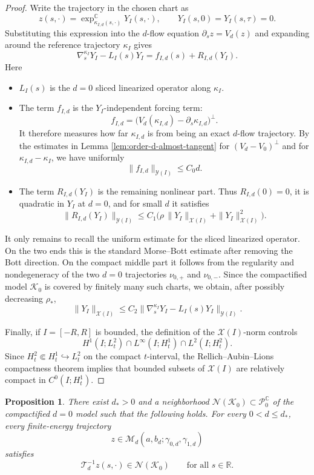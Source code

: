 \documentclass[11pt]{amsart}
\theoremstyle{plain}
\newtheorem{prop}[thm]{Proposition}
\theoremstyle{definition}
\newcommand{\R}{\mathbb{R}}
\newcommand{\C}{\mathbb{C}}
\newcommand{\PP}{\mathcal{P}}
\begin{document}
\begin{proof}
Write the trajectory in the chosen chart as
\[
z(s,\cdot)=\exp_{\kappa_{I,d}(s,\cdot)}^{\C}Y_I(s,\cdot),\qquad Y_I(s,0)=Y_I(s,\tau)=0 .
\]
Substituting this expression into the $d$-flow equation $\partial_s z=V_d(z)$ and expanding around the reference trajectory $\kappa_I$ gives
\[
\nabla^{\kappa_I}_{s}Y_I-L_I(s)Y_I
=f_{I,d}(s)+R_{I,d}(Y_I).
\]
Here 
\begin{itemize}
\setlength{\itemsep}{-1pt}
    \item $L_I(s)$ is the $d=0$ sliced linearized operator along $\kappa_I$.
    \item The term $f_{I,d}$ is the $Y_I$-independent forcing term:
    \[
 f_{I,d}
 =\bigl(V_d(\kappa_{I,d})-\partial_s\kappa_{I,d}\bigr)^{\perp}.
\]
It therefore measures how far $\kappa_{I,d}$ is from being an exact
$d$-flow trajectory. By the estimates in Lemma \ref{lem:order-d-almost-tangent} for $(V_d-V_0)^{\perp}$ and for
$\kappa_{I,d}-\kappa_I$, we have uniformly
\[
\|f_{I,d}\|_{\mathcal Y(I)}\le C_0 d.
\]
    \item The term $R_{I,d}(Y_I)$ is the remaining nonlinear part. Thus $R_{I,d}(0)=0$, it is quadratic in $Y_I$ at $d=0$,
and for small $d$ it satisfies
\[
\|R_{I,d}(Y_I)\|_{\mathcal Y(I)}\le C_1\bigl(\rho\,\|Y_I\|_{\mathcal X(I)}+\|Y_I\|_{\mathcal X(I)}^2\bigr).
\]
\end{itemize}


It only remains to recall the uniform estimate for the sliced linearized
operator.  On the two ends this is the standard Morse--Bott estimate after
removing the Bott direction.  On the compact middle part it follows from
the regularity and nondegeneracy of the two $d=0$ trajectories
$\nu_{0,+}$ and $\nu_{0,-}$. Since the compactified model
$\mathcal K_0$ is covered by finitely many such charts, we obtain, after
possibly decreasing $\rho_*$,
\[
\|Y_I\|_{\mathcal X(I)}\le C_2\bigl\|
\nabla^{\kappa_I}_{s}Y_I-L_I(s)Y_I
\bigr\|_{\mathcal Y(I)} .
\]

Finally, if $I=[-R,R]$ is bounded, the definition of the
$\mathcal X(I)$-norm controls
\[
H^1(I;L_t^2)\cap L^\infty(I;H_t^1)\cap L^2(I;H_t^2).
\]
Since $H_t^2\Subset H_t^1\hookrightarrow L_t^2$ on the compact
$t$-interval, the Rellich--Aubin--Lions compactness theorem implies that
bounded subsets of $\mathcal X(I)$ are relatively compact in $C^0(I;H_t^1)$.
\end{proof}


\begin{prop}\label{prop:no-escape-small-d}
There exist $d_*>0$ and a neighborhood $\mathcal N(\mathcal{K}_0)\subset \PP^{\C}_0$
of the compactified $d=0$ model such that the following holds. For every
$0<d\le d_*$, every finite-energy trajectory
\[
z\in \mathcal{M}_d(a,b_d;\gamma_{0,d},\gamma_{1,d})
\]
satisfies
\[
\mathcal T_d^{-1}z(s,\cdot)\in \mathcal N(\mathcal{K}_0)
\qquad\text{for all }s\in\R.
\]
\end{prop}
\end{document}
